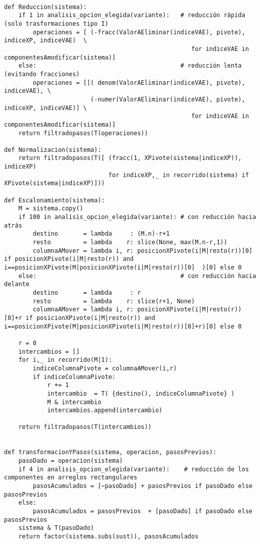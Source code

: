 \documentclass[11pt]{report}
\begin{document}
\begin{verbatim}
    
def Reduccion(sistema):
    if 1 in analisis_opcion_elegida(variante):   # reducción rápida (solo trasformaciones tipo I)
        operaciones = [ (-fracc(ValorAEliminar(indiceVAE), pivote), indiceXP, indiceVAE)  \
                                                    for indiceVAE in componentesAmodificar(sistema)]
    else:                                        # reducción lenta (evitando fracciones)
        operaciones = [[( denom(ValorAEliminar(indiceVAE), pivote),           indiceVAE), \
                        (-numer(ValorAEliminar(indiceVAE), pivote), indiceXP, indiceVAE)] \
                                                    for indiceVAE in componentesAmodificar(sistema)]
    return filtradopasos(T(operaciones))

def Normalizacion(sistema):
    return filtradopasos(T([ (fracc(1, XPivote(sistema|indiceXP)), indiceXP)
                             for indiceXP,_ in recorrido(sistema) if XPivote(sistema|indiceXP)]))

def Escalonamiento(sistema):
    M = sistema.copy()
    if 100 in analisis_opcion_elegida(variante): # con reducción hacia atrás
        destino       = lambda     : (M.n)-r+1
        resto         = lambda    r: slice(None, max(M.n-r,1))
        columnaAMover = lambda i, r: posicionXPivote(i|M|resto(r))[0]   if posicionXPivote(i|M|resto(r)) and i==posicionXPivote(M|posicionXPivote(i|M|resto(r))[0]  )[0] else 0
    else:                                        # con reducción hacia delante
        destino       = lambda     : r
        resto         = lambda    r: slice(r+1, None)
        columnaAMover = lambda i, r: posicionXPivote(i|M|resto(r))[0]+r if posicionXPivote(i|M|resto(r)) and i==posicionXPivote(M|posicionXPivote(i|M|resto(r))[0]+r)[0] else 0

    r = 0
    intercambios = []
    for i,_ in recorrido(M|1):
        indiceColumnaPivote = columnaAMover(i,r)
        if indiceColumnaPivote:
            r += 1
            intercambio  = T( {destino(), indiceColumnaPivote} )
            M & intercambio
            intercambios.append(intercambio)
            
    return filtradopasos(T(intercambios))


def transformacionYPasos(sistema, operacion, pasosPrevios):
    pasoDado = operacion(sistema)
    if 4 in analisis_opcion_elegida(variante):    # reducción de los componentes en arreglos rectangulares
        pasosAcumulados = [~pasoDado] + pasosPrevios if pasoDado else pasosPrevios
    else:
        pasosAcumulados = pasosPrevios  + [pasoDado] if pasoDado else pasosPrevios
    sistema & T(pasoDado)
    return factor(sistema.subs(sust)), pasosAcumulados



\end{verbatim}
\end{document}
